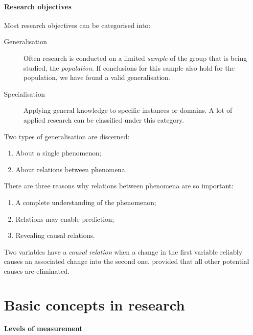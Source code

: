 \paragraph{Research objectives}

Most research objectives can be categorised into:

\begin{description}
	\item[Generalisation] Often research is conducted on a limited \emph{sample} of the group that is being studied, the \emph{population}. If conclusions for this sample also hold for the population, we have found a valid generalisation.
    \item[Specialisation] Applying general knowledge to specific instances or domains. A lot of applied research can be classified under this category.
\end{description}

Two types of generalisation are discerned:

\begin{enumerate}
	\item About a single phenomenon;
	\item About relations between phenomena.
\end{enumerate}

There are three reasons why relations between phenomena are so important:

\begin{enumerate}
	\item A complete understanding of the phenomenon;
	\item Relations may enable prediction;
	\item Revealing causal relations.
\end{enumerate}

\begin{definition}
    Two variables have a \emph{causal relation} when a change in the first variable reliably causes an associated change into the second one, provided that all other potential causes are eliminated.
\end{definition}

\section{Basic concepts in research}

\paragraph{Levels of measurement}

